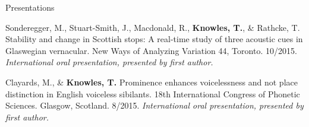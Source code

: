 \documentclass{resume} %
\begin{document}
\begin{rSection}{Presentations}
\begin{etaremune}
%	
%	
%	
	
\item Sonderegger, M., Stuart-Smith, J., Macdonald, R., {\bf Knowles, T.}, \& Rathcke, T. Stability and change in Scottish stops: A real-time study of three acoustic cues in Glaswegian vernacular. New Ways of Analyzing Variation 44, Toronto. 10/2015. \emph{International oral presentation, presented by first author.}
	
\item Clayards, M., \& {\bf Knowles, T.} Prominence enhances voicelessness and not place distinction in English voiceless sibilants. 18th International Congress of Phonetic Sciences. Glasgow, Scotland. 8/2015. \emph{International oral presentation, presented by first author.}
	

\end{etaremune}
\end{rSection}
\end{document}
